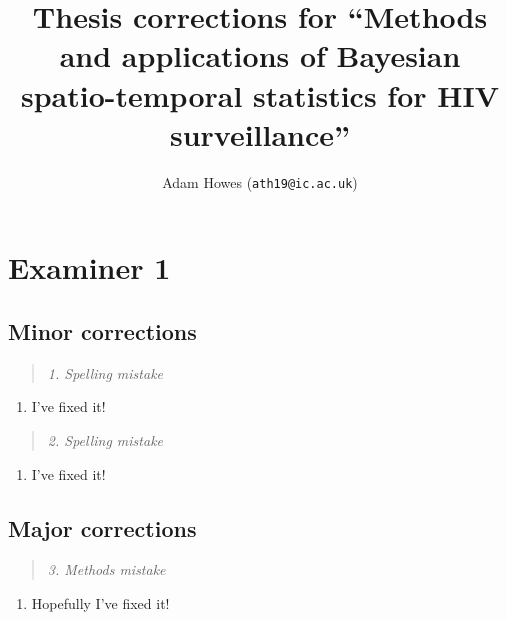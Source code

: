 \documentclass[
]{article}
\title{Thesis corrections for ``Methods and applications of Bayesian
spatio-temporal statistics for HIV surveillance''}
\subtitle{Adam Howes (\texttt{ath19@ic.ac.uk})}
\author{}
\date{\vspace{-2.5em}}
\providecommand{\tightlist}{%
  \setlength{\itemsep}{0pt}\setlength{\parskip}{0pt}}
\begin{document}
\maketitle

{
\setcounter{tocdepth}{2}
\tableofcontents
}
\newpage

\hypertarget{examiner-1}{%
\section*{Examiner 1}\label{examiner-1}}

\hypertarget{minor-corrections}{%
\subsection*{Minor corrections}\label{minor-corrections}}

\begin{quote}
\emph{1. Spelling mistake}
\end{quote}

\begin{enumerate}
\def\labelenumi{\arabic{enumi}.}
\tightlist
\item
  I've fixed it!
\end{enumerate}

\begin{quote}
\emph{2. Spelling mistake}
\end{quote}

\begin{enumerate}
\def\labelenumi{\arabic{enumi}.}
\setcounter{enumi}{1}
\tightlist
\item
  I've fixed it!
\end{enumerate}

\hypertarget{major-corrections}{%
\subsection*{Major corrections}\label{major-corrections}}

\begin{quote}
\emph{3. Methods mistake}
\end{quote}

\begin{enumerate}
\def\labelenumi{\arabic{enumi}.}
\setcounter{enumi}{2}
\tightlist
\item
  Hopefully I've fixed it!
\end{enumerate}
\end{document}
